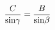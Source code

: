 \documentclass[preview]{standalone}
\begin{document}
\begin{align*}
{ C \over {\rm sin} \gamma } = { B \over {\rm sin} \beta }
\end{align*}
\end{document}
